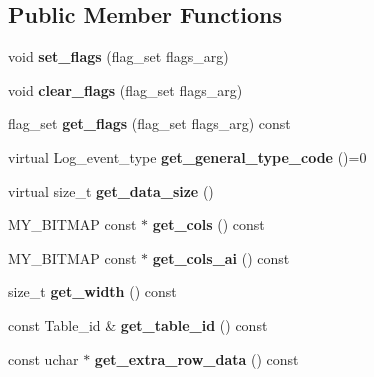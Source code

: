 \subsection*{Public Member Functions}
\begin{DoxyCompactItemize}
\item 
\mbox{\label{classRows__log__event_af1ea4577c69993a11c0f7b0abc962d56}} 
void {\bfseries set\+\_\+flags} (flag\+\_\+set flags\+\_\+arg)
\item 
\mbox{\label{classRows__log__event_ac6202f24575f0e5c613052662e6ed20d}} 
void {\bfseries clear\+\_\+flags} (flag\+\_\+set flags\+\_\+arg)
\item 
\mbox{\label{classRows__log__event_aef6f5fa9a4d1088af8d7fb0ad348743f}} 
flag\+\_\+set {\bfseries get\+\_\+flags} (flag\+\_\+set flags\+\_\+arg) const
\item 
\mbox{\label{classRows__log__event_a0584a5373168c13d361b2bfeae37e8ed}} 
virtual Log\+\_\+event\+\_\+type {\bfseries get\+\_\+general\+\_\+type\+\_\+code} ()=0
\item 
\mbox{\label{classRows__log__event_a4a5bcde528cb0b5b82ec63432cbd7f30}} 
virtual size\+\_\+t {\bfseries get\+\_\+data\+\_\+size} ()
\item 
\mbox{\label{classRows__log__event_a14993d52994c08778f892733a0b29162}} 
M\+Y\+\_\+\+B\+I\+T\+M\+AP const  $\ast$ {\bfseries get\+\_\+cols} () const
\item 
\mbox{\label{classRows__log__event_aee84e81db598dc231d077141c492a201}} 
M\+Y\+\_\+\+B\+I\+T\+M\+AP const  $\ast$ {\bfseries get\+\_\+cols\+\_\+ai} () const
\item 
\mbox{\label{classRows__log__event_a1b0f8f45d476d82ba4564bb72d65cdad}} 
size\+\_\+t {\bfseries get\+\_\+width} () const
\item 
\mbox{\label{classRows__log__event_a28510b5571022d01fa26c13e4437b41b}} 
const Table\+\_\+id \& {\bfseries get\+\_\+table\+\_\+id} () const
\item 
\mbox{\label{classRows__log__event_adf9f246360b677be3b352b5f7e52625f}} 
const uchar $\ast$ {\bfseries get\+\_\+extra\+\_\+row\+\_\+data} () const
\end{DoxyCompactItemize}
